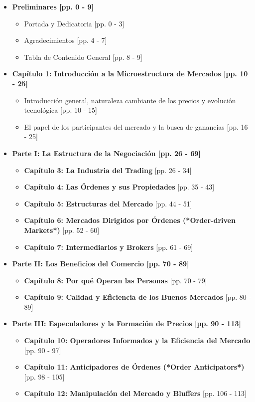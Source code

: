 \documentclass[11pt,a4paper]{article}
\begin{document}
\begin{itemize}
    \item \textbf{Preliminares [pp. 0 - 9]}
    \begin{itemize}
        \item Portada y Dedicatoria [pp. 0 - 3]
        \item Agradecimientos [pp. 4 - 7]
        \item Tabla de Contenido General [pp. 8 - 9]
    \end{itemize}
    
    \item \textbf{Capítulo 1: Introducción a la Microestructura de Mercados [pp. 10 - 25]}
    \begin{itemize}
        \item Introducción general, naturaleza cambiante de los precios y evolución tecnológica [pp. 10 - 15]
        \item El papel de los participantes del mercado y la busca de ganancias [pp. 16 - 25]
    \end{itemize}

    \item \textbf{Parte I: La Estructura de la Negociación [pp. 26 - 69]}
    \begin{itemize}
        \item \textbf{Capítulo 3: La Industria del Trading} [pp. 26 - 34]
        \item \textbf{Capítulo 4: Las Órdenes y sus Propiedades} [pp. 35 - 43]
        \item \textbf{Capítulo 5: Estructuras del Mercado} [pp. 44 - 51]
        \item \textbf{Capítulo 6: Mercados Dirigidos por Órdenes (*Order-driven Markets*)} [pp. 52 - 60]
        \item \textbf{Capítulo 7: Intermediarios y Brokers} [pp. 61 - 69]
    \end{itemize}

    \item \textbf{Parte II: Los Beneficios del Comercio [pp. 70 - 89]}
    \begin{itemize}
        \item \textbf{Capítulo 8: Por qué Operan las Personas} [pp. 70 - 79]
        \item \textbf{Capítulo 9: Calidad y Eficiencia de los Buenos Mercados} [pp. 80 - 89]
    \end{itemize}

    \item \textbf{Parte III: Especuladores y la Formación de Precios [pp. 90 - 113]}
    \begin{itemize}
        \item \textbf{Capítulo 10: Operadores Informados y la Eficiencia del Mercado} [pp. 90 - 97]
        \item \textbf{Capítulo 11: Anticipadores de Órdenes (*Order Anticipators*)} [pp. 98 - 105]
        \item \textbf{Capítulo 12: Manipulación del Mercado y Bluffers} [pp. 106 - 113]
    \end{itemize}


\end{itemize}
\end{document}
